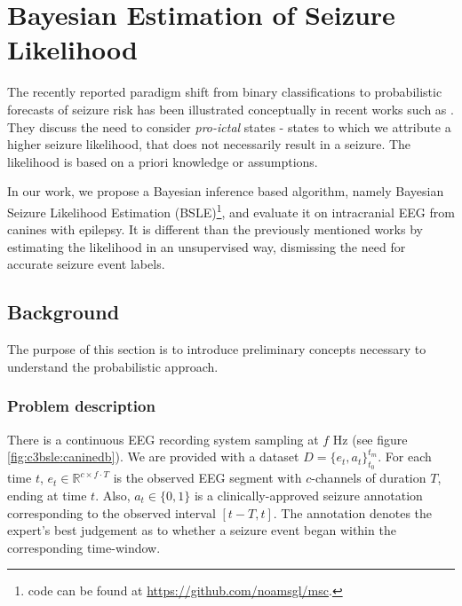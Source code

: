 
\chapter{Bayesian Estimation of Seizure Likelihood}
\label{ch:3Bsle}

The recently reported paradigm shift from binary classifications to probabilistic forecasts of seizure risk has been illustrated conceptually in recent works such as \citet{karoly2017circadian, baud2018multi, baud2020chance}. They discuss the need to consider \emph{pro-ictal} states - states to which we attribute a higher seizure likelihood, that does not necessarily result in a seizure. The likelihood is based on a priori knowledge or assumptions.

In our work, we propose a Bayesian inference based algorithm, namely Bayesian Seizure Likelihood Estimation (BSLE)\footnote{code can be found at \url{https://github.com/noamsgl/msc}.}, and evaluate it on intracranial EEG from canines with epilepsy. It is different than the previously mentioned works by estimating the likelihood in an unsupervised way, dismissing the need for accurate seizure event labels.


\section{Background}
The purpose of this section is to introduce preliminary concepts necessary to understand the probabilistic approach.



\subsection{Problem description}
\label{sec:2background:setup}

There is a continuous EEG recording system sampling at $f$ Hz (see figure \ref{fig:c3bsle:caninedb}). We are provided with a dataset $D = \{e_t, a_t\}_{t_0}^{t_m}$. For each time $t$, $e_t \in \mathbb{R}^{c \times f \cdot T}$ is the observed EEG segment with $c$-channels of duration $T$, ending at time $t$. Also, $a_t \in \{0, 1\}$ is a clinically-approved seizure annotation corresponding to the observed interval $[t - T, t]$. The annotation denotes the expert's best judgement as to whether a seizure event began within the corresponding time-window.

